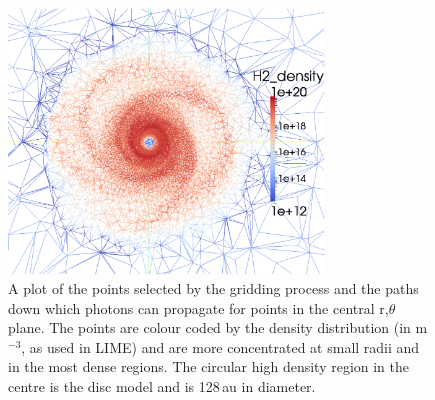 \documentclass[useAMS,usenatbib]{mn2e}
\begin{document}
\begin{figure}
 \includegraphics[width=84mm]{Figures/model/lime2.eps}%
 \caption{A plot of the points selected by the gridding process and the paths down which photons can propagate for points in the central r,$\theta$ plane. The points are colour coded by the density distribution (in m$^{-3}$, as used in LIME) and are more concentrated at small radii and in the most dense regions. The circular high density region in the centre is the disc model and is 128$\,$au in diameter.}
 \label{grid}
\end{figure}
\end{document}
